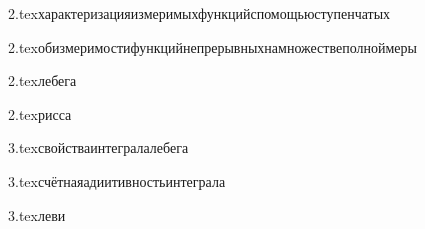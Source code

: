 {2.tex}{характеризацияизмеримыхфункцийспомощьюступенчатых}

{2.tex}{обизмеримостифункцийнепрерывныхнамножествеполноймеры}

{2.tex}{лебега}

{2.tex}{рисса}

{3.tex}{свойстваинтегралалебега}

{3.tex}{счётнаяадиитивностьинтеграла}

{3.tex}{леви}


















